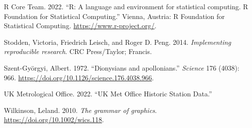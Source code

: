 \documentclass[smallextended]{svjour3}       %
\newlength{\cslhangindent}
\newlength{\cslentryspacingunit} %
\newenvironment{CSLReferences}[2] %
 {%
  \setlength{\parindent}{0pt}
  \ifodd #1
  \let\oldpar\par
  \def\par{\hangindent=\cslhangindent\oldpar}
  \fi
  \setlength{\parskip}{#2\cslentryspacingunit}
 }%
 {}
\begin{document}
\begin{CSLReferences}{1}{0}
\leavevmode{}%
R Core Team. 2022. {``{R: A language and environment for statistical computing. R Foundation for Statistical Computing}.''} Vienna, Austria: R Foundation for Statistical Computing. \url{https://www.r-project.org/}.

\leavevmode{}%
Stodden, Victoria, Friedrich Leisch, and Roger D. Peng. 2014. \emph{{Implementing reproducible research}}. CRC Press/Taylor; Francis.

\leavevmode{}%
Szent-Györgyi, Albert. 1972. {``{Dionysians and apollonians}.''} \emph{Science} 176 (4038): 966. \url{https://doi.org/10.1126/science.176.4038.966}.

\leavevmode{}%
UK Metrological Office. 2022. {``{UK Met Office Historic Station Data}.''}

\leavevmode{}%
Wilkinson, Leland. 2010. \emph{{The grammar of graphics}}. \url{https://doi.org/10.1002/wics.118}.

\end{CSLReferences}




\end{document}
